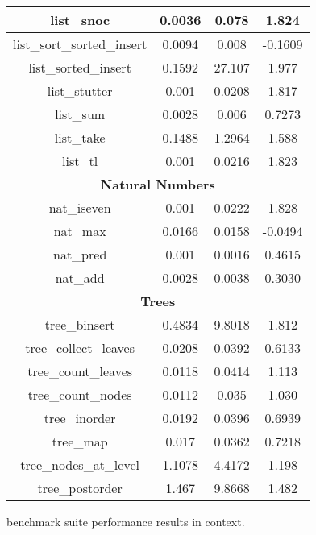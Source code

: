 \begin{figure}
\begin{center}
\begin{tabular}{|c|c|c|c|}
\hline
list\_snoc & 0.0036 & 0.078 & 1.824 \\
\hline
list\_sort\_sorted\_insert & 0.0094 & 0.008 & -0.1609 \\
\hline
list\_sorted\_insert & 0.1592 & 27.107 & 1.977 \\
\hline
list\_stutter & 0.001 & 0.0208 & 1.817 \\
\hline
list\_sum & 0.0028 & 0.006 & 0.7273 \\
\hline
list\_take & 0.1488 & 1.2964 & 1.588 \\
\hline
list\_tl & 0.001 & 0.0216 & 1.823 \\
\hline
\multicolumn{4}{|c|}{\textbf{Natural Numbers}} \\
\hline
nat\_iseven & 0.001 & 0.0222 & 1.828 \\
\hline
nat\_max & 0.0166 & 0.0158 & -0.0494 \\
\hline
nat\_pred & 0.001 & 0.0016 & 0.4615 \\
\hline
nat\_add & 0.0028 & 0.0038 & 0.3030 \\
\hline
\multicolumn{4}{|c|}{\textbf{Trees}} \\
\hline
tree\_binsert & 0.4834 & 9.8018 & 1.812 \\
\hline
tree\_collect\_leaves & 0.0208 & 0.0392 & 0.6133 \\
\hline
tree\_count\_leaves & 0.0118 & 0.0414 & 1.113 \\
\hline
tree\_count\_nodes & 0.0112 & 0.035 & 1.030 \\
\hline
tree\_inorder & 0.0192 & 0.0396 & 0.6939 \\
\hline
tree\_map & 0.017 & 0.0362 & 0.7218 \\
\hline
tree\_nodes\_at\_level & 1.1078 & 4.4172 & 1.198 \\
\hline
tree\_postorder & 1.467 & 9.8668 & 1.482 \\

  \hline
  \end{tabular}
  \end{center}
  \caption[\myth{} benchmark suite performance results in context]{%
    \myth{} benchmark suite performance results in context.
  }
  \label{fig:myth-raw-context}
\end{figure}
